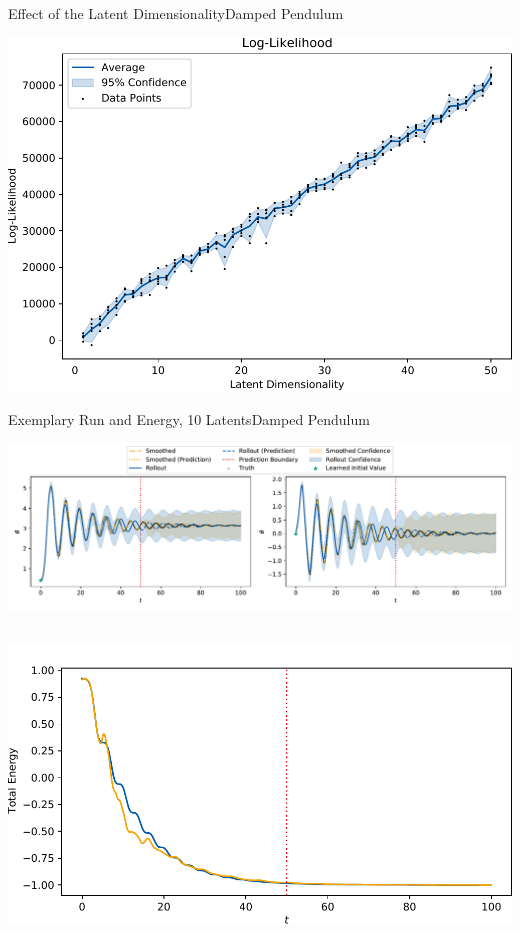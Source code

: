 \documentclass[
	aspectratio=43,
	color={accentcolor=1c},
	logo=false,
	colorframetitle=true,
]{tudabeamer}
\begin{document}
\begin{frame}{Effect of the Latent Dimensionality}{Damped Pendulum}
				\vspace{-0.4cm}
				\begin{center}
					\includegraphics[width=0.36\linewidth]{figures/experiments/pendulum-damped/latent-dim/comparison-log-likelihood-mean-vs-latent-dim.pdf}
				\end{center}
			\end{frame}

			\begin{frame}[c]{Exemplary Run and Energy, 10 Latents}{Damped Pendulum}
				\begin{center}
					\includegraphics[width=\linewidth]{figures/experiments/pendulum-damped/rollout-observations-N0.pdf}
				\end{center}
				\vspace{-1cm}
				\begin{columns}
					\begin{column}{0.333\linewidth}
						\begin{center}
							\includegraphics[width=\linewidth]{figures/experiments/pendulum-damped/energy-R110-N0-total.pdf}

\end{center}
\end{column}
\end{columns}
\end{frame}
\end{document}
